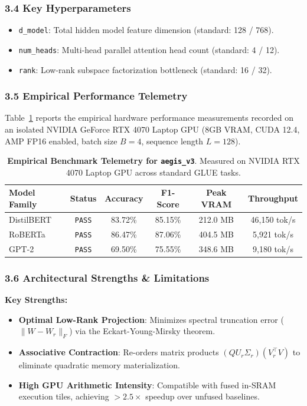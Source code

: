 \subsubsection*{3.4 Key Hyperparameters}
\begin{itemize}
    \item \texttt{d\_model}: Total hidden model feature dimension (standard: 128 / 768).
    \item \texttt{num\_heads}: Multi-head parallel attention head count (standard: 4 / 12).
    \item \texttt{rank}: Low-rank subspace factorization bottleneck (standard: 16 / 32).
\end{itemize}

\subsubsection*{3.5 Empirical Performance Telemetry}
Table~\ref{tab:telemetry_aegis_v3} reports the empirical hardware performance measurements recorded on an isolated NVIDIA GeForce RTX 4070 Laptop GPU (8GB VRAM, CUDA 12.4, AMP FP16 enabled, batch size $B=4$, sequence length $L=128$).

\begin{table}[h]
\centering
\small
\caption{\textbf{Empirical Benchmark Telemetry for \texttt{aegis\_v3}}. Measured on NVIDIA RTX 4070 Laptop GPU across standard GLUE tasks.}
\label{tab:telemetry_aegis_v3}
\begin{tabular*}{\columnwidth}{@{\extracolsep{\fill}}lccccc}
\toprule
\textbf{Model Family} & \textbf{Status} & \textbf{Accuracy} & \textbf{F1-Score} & \textbf{Peak VRAM} & \textbf{Throughput} \\
\midrule
DistilBERT & \texttt{PASS} & 83.72\% & 85.15\% & 212.0 MB & 46,150 tok/s \\
RoBERTa    & \texttt{PASS} & 86.47\% & 87.06\% & 404.5 MB & 5,921 tok/s \\
GPT-2      & \texttt{PASS} & 69.50\% & 75.55\% & 348.6 MB & 9,180 tok/s \\
\bottomrule
\end{tabular*}
\end{table}

\subsubsection*{3.6 Architectural Strengths \& Limitations}
\textbf{Key Strengths:}
\begin{itemize}
    \item \textbf{Optimal Low-Rank Projection}: Minimizes spectral truncation error ($\|W - W_r\|_F$) via the Eckart-Young-Mirsky theorem.
    \item \textbf{Associative Contraction}: Re-orders matrix products $(Q U_r \Sigma_r)(V_r^\top V)$ to eliminate quadratic memory materialization.
    \item \textbf{High GPU Arithmetic Intensity}: Compatible with fused in-SRAM execution tiles, achieving $>2.5\times$ speedup over unfused baselines.
\end{itemize}

